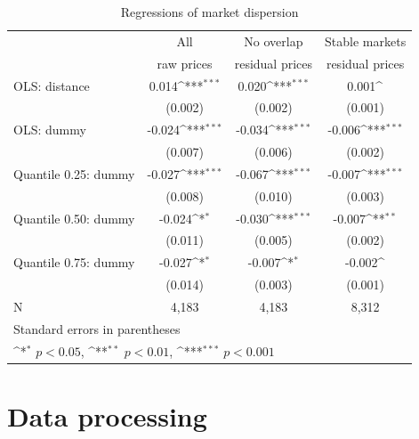\documentclass[11pt]{article}
\begin{document}
\begin{table}[htbp]\centering
\def\sym#1{\ifmmode^{#1}\else\(^{#1}\)\fi}
\caption{Regressions of market dispersion}
\begin{tabular}{lccc}
\hline
\hline
{} & All & No overlap & Stable markets\\
{} & raw prices & residual prices & residual prices \\
\hline
OLS: distance                   & 0.014\sym{***}    &  0.020\sym{***}  &       0.001\sym{}\\
{}                                      &  (0.002)                 & (0.002)                 &     (0.001)   \\
OLS: dummy                     &  -0.024\sym{***} & -0.034\sym{***}  &     -0.006\sym{***}\\
{}                                      & (0.007)                  &(0.006)                  &     (0.002) \\
Quantile 0.25: dummy      & -0.027\sym{***}  &-0.067\sym{***}   &       -0.007\sym{***}\\
{}                                      &    (0.008)               & (0.010)                 &     (0.003)  \\
Quantile 0.50: dummy      & -0.024\sym{*}      & -0.030\sym{***}  &       -0.007\sym{**}\\
{}                                      &  (0.011)                 & (0.005)                 &     (0.002)    \\
Quantile 0.75: dummy      & -0.027\sym{*}      & -0.007\sym{*}      &       -0.002\sym{}\\
{}                                      &     (0.014)              & (0.003)                 &     (0.001)   \\
\hline
N                                       & 4,183         &   4,183     &     8,312    \\
\hline\hline
\multicolumn{4}{l}{\footnotesize Standard errors in parentheses}\\
\multicolumn{4}{l}{\footnotesize \sym{*} \(p<0.05\), \sym{**} \(p<0.01\), \sym{***} \(p<0.001\)}\\
\end{tabular}
\end{table}

\newpage



\newpage

\appendix

\section{Data processing}
\end{document}
